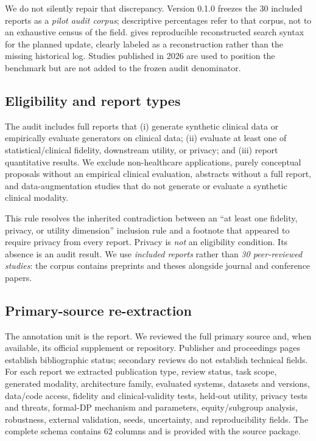 \documentclass[11pt,letterpaper]{article}
\begin{document}
We do not silently repair that discrepancy. Version 0.1.0 freezes the 30 included reports as a \emph{pilot audit corpus}; descriptive percentages refer to that corpus, not to an exhaustive census of the field.  gives reproducible reconstructed search syntax for the planned update, clearly labeled as a reconstruction rather than the missing historical log. Studies published in 2026 are used to position the benchmark but are not added to the frozen audit denominator.

\subsection{Eligibility and report types}

The audit includes full reports that (i) generate synthetic clinical data or empirically evaluate generators on clinical data; (ii) evaluate at least one of statistical/clinical fidelity, downstream utility, or privacy; and (iii) report quantitative results. We exclude non-healthcare applications, purely conceptual proposals without an empirical clinical evaluation, abstracts without a full report, and data-augmentation studies that do not generate or evaluate a synthetic clinical modality.

This rule resolves the inherited contradiction between an ``at least one fidelity, privacy, or utility dimension'' inclusion rule and a footnote that appeared to require privacy from every report. Privacy is \emph{not} an eligibility condition. Its absence is an audit result. We use \emph{included reports} rather than \emph{30 peer-reviewed studies}: the corpus contains preprints and theses alongside journal and conference papers.

\subsection{Primary-source re-extraction}

The annotation unit is the report. We reviewed the full primary source and, when available, its official supplement or repository. Publisher and proceedings pages establish bibliographic status; secondary reviews do not establish technical fields. For each report we extracted publication type, review status, task scope, generated modality, architecture family, evaluated systems, datasets and versions, data/code access, fidelity and clinical-validity tests, held-out utility, privacy tests and threats, formal-DP mechanism and parameters, equity/subgroup analysis, robustness, external validation, seeds, uncertainty, and reproducibility fields. The complete schema contains 62 columns and is provided with the source package.
\end{document}
